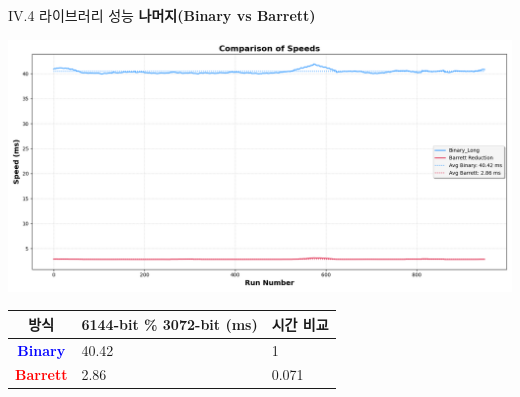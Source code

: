 \documentclass{beamer}
\begin{document}
\begin{frame}{IV.4 라이브러리 성능}
	\alert{\bf 나머지(Binary vs Barrett)}\\
	\begin{center}
		\includegraphics[width=\linewidth,height=.525\textheight]{red_3072.png}
	\end{center}
	\begin{center}
		\begin{tabularx}{\textwidth}{c||XX}
			\hline
			방식 & 6144-bit \% 3072-bit (ms) & 시간 비교\\
			\midrule
			\textcolor{blue}{\bf Binary} & 40.42 & 1 \\
			\textcolor{red}{\bf Barrett} & 2.86 & 0.071\\
			\hline
		\end{tabularx}
	\end{center}
\end{frame}
\end{document}
